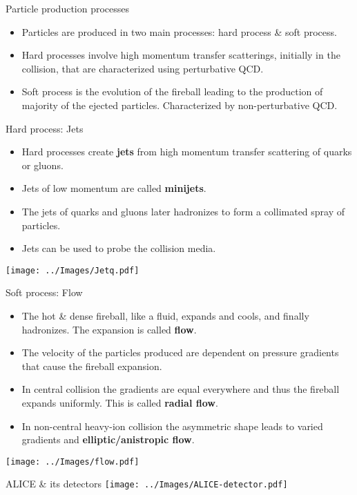 \documentclass{beamer}
\begin{document}
\begin{frame}{Particle production processes}
	\begin{itemize}
		\item Particles are produced in two main processes: hard process \& soft process.
		\item Hard processes involve high momentum transfer scatterings, initially in the collision, that are characterized using perturbative QCD.
		\item Soft process is the evolution of the fireball leading to the production of majority of the ejected particles. Characterized by non-perturbative QCD.
	\end{itemize}
\end{frame}
\begin{frame}{Hard process: Jets}
	\begin{itemize}
		\item Hard processes create \textbf{jets} from high momentum transfer scattering of quarks or gluons.
		\item Jets of low momentum are called \textbf{minijets}.
		\item The jets of quarks and gluons later hadronizes to form a collimated spray of particles.
		\item Jets can be used to probe the collision media.
	\end{itemize}
	\centering
	\texttt{[image: ../Images/Jetq.pdf]}
\end{frame}
\begin{frame}{Soft process: Flow}
	\begin{itemize}
		\item The hot \& dense fireball, like a fluid, expands and cools, and finally hadronizes. The expansion is called \textbf{flow}.
		\item The velocity of the particles produced are dependent on pressure gradients that cause the fireball expansion.
		\item In central collision the gradients are equal everywhere and thus the fireball expands uniformly. This is called \textbf{radial flow}.
		\item In non-central heavy-ion collision the asymmetric shape leads to varied gradients and \textbf{elliptic/anistropic flow}.
	\end{itemize}
	\centering
	\texttt{[image: ../Images/flow.pdf]}
\end{frame}
\begin{frame}{ALICE \& its detectors}
	\texttt{[image: ../Images/ALICE-detector.pdf]}
\end{frame}
\end{document}
